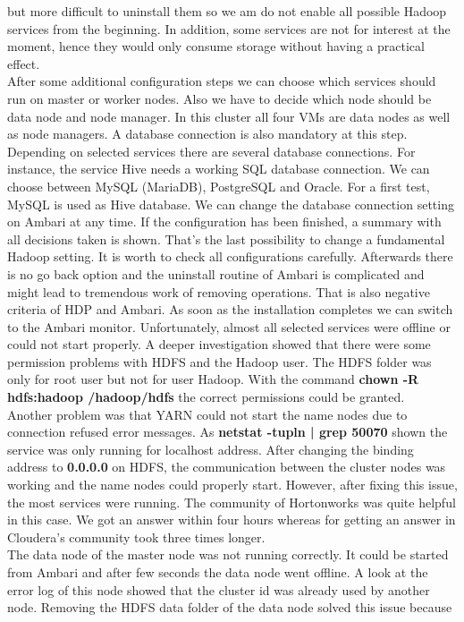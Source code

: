 \documentclass[12pt]{article}
\begin{document}
but more difficult to uninstall them so we am do not enable all possible Hadoop services from the
beginning. In addition, some services are not for interest at the moment, hence they would only consume
storage without having a practical effect.\\
After some additional configuration steps we can choose which services should run on master or worker
nodes. Also we have to decide which node should be data node and node manager. In this cluster all four VMs are data nodes as well as node managers. A database connection is also mandatory at this step. Depending on selected services there are several database connections. For instance, the
service Hive needs a working SQL database connection. We can choose between MySQL (MariaDB),
PostgreSQL and Oracle. For a first test, MySQL is used as Hive database. We can change the database
connection setting on Ambari at any time. If the configuration has been finished, a summary with all decisions taken is shown. That’s the last possibility to change a fundamental Hadoop setting. It is worth to check all configurations carefully. Afterwards there is no go back option and the uninstall routine of Ambari is complicated and might lead to tremendous work of removing operations. That is also negative criteria of HDP and Ambari. As soon as the installation completes we can switch to the Ambari monitor. Unfortunately, almost all
selected services were offline or could not start properly. A deeper investigation showed that there were
some permission problems with HDFS and the Hadoop user. The HDFS folder was only for root user but
not for user \glqq Hadoop\grqq. With the command \textbf{chown -R hdfs:hadoop /hadoop/hdfs} the correct permissions could be granted.\\
Another problem was that YARN could not start the name nodes due to connection refused error
messages. As \textbf{netstat -tupln | grep 50070} shown the service was only running for localhost address. After changing the binding address to \textbf{0.0.0.0} on HDFS, the communication between the cluster nodes was working and the name nodes could properly start. However, after fixing this issue, the most services were running. The community of Hortonworks was quite helpful in this case. We got an answer within four hours whereas for getting an answer in Cloudera’s community took three times longer.\\
The data node of the master node was not running correctly. It could be started from Ambari and after
few seconds the data node went offline. A look at the error log of this node showed that the cluster id was already used by another node. Removing the HDFS data folder of the data node solved this issue because
\end{document}
